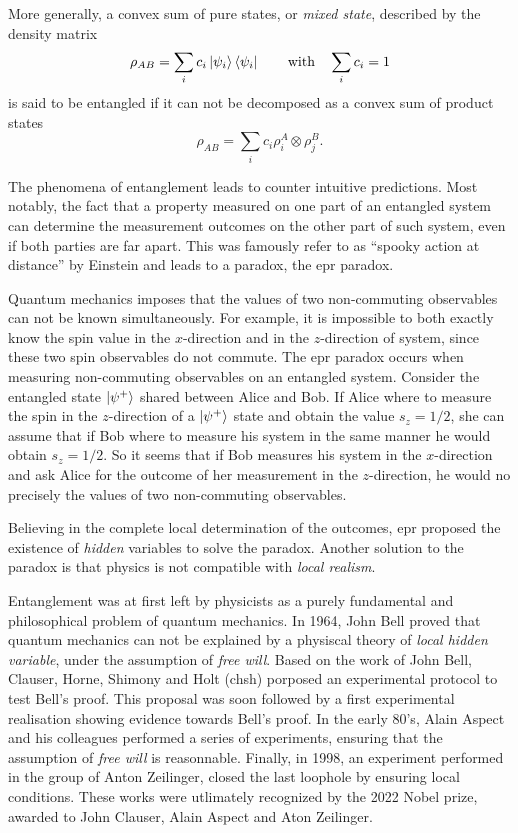 More generally, a convex sum of pure states, or \textit{mixed state}, described by the density matrix
\begin{equation}
	\rho_{AB} = \sum_i c_i \ket{\psi_i} \bra{\psi_i} \qquad \text{with} \quad \sum_i c_i = 1
	\label{eq:mixed_state}
\end{equation}
is said to be entangled if it can not be decomposed as a convex sum of product states
\begin{equation}
	\rho_{AB} = \sum_i c_i \rho^A_i \otimes \rho^B_j.
	\label{eq:product_state}
\end{equation}

\medbreak
The phenomena of entanglement leads to counter intuitive predictions. 
Most notably, the fact that a property measured on one part of an entangled system can determine the measurement outcomes on the other part of such system, even if both parties are far apart. 
This was famously refer to as \enquote{spooky action at distance} by Einstein and leads to a paradox, the \acrshort{epr} paradox.

Quantum mechanics imposes that the values of two non-commuting observables can not be known simultaneously. 
For example, it is impossible to both exactly know the spin value in the $x$-direction and in the $z$-direction of system, since these two spin observables do not commute.
The \acrshort{epr} paradox occurs when measuring non-commuting observables on an entangled system.
Consider the entangled state $\ket{\psi^+}$ shared between Alice and Bob.
If Alice where to measure the spin in the $z$-direction of a $\ket{\psi^+}$ state and obtain the value $s_z = 1/2$, she can assume that if Bob where to measure his system in the same manner he would obtain $s_z = 1/2$. 
So it seems that if Bob measures his system in the $x$-direction and ask Alice for the outcome of her measurement in the $z$-direction, he would no precisely the values of two non-commuting observables.

Believing in the complete local determination of the outcomes, \acrlong{epr} proposed the existence of \textit{hidden} variables to solve the paradox. Another solution to the paradox is that physics is not compatible with \textit{local realism}.

\medbreak
Entanglement was at first left by physicists as a purely fundamental and philosophical problem of quantum mechanics.
In 1964, John Bell proved that quantum mechanics can not be explained by a physiscal theory of \textit{local hidden variable}, under the assumption of \textit{free will}. 
Based on the work of John Bell, Clauser, Horne, Shimony and Holt (\acrshort{chsh}) porposed an experimental protocol to test Bell's proof. 
This proposal was soon followed by a first experimental realisation showing evidence towards Bell's proof.
In the early 80's, Alain Aspect and his colleagues performed a series of experiments, ensuring that the assumption of \textit{free will} is reasonnable.
Finally, in 1998, an experiment performed in the group of Anton Zeilinger, closed the last loophole by ensuring local conditions.
These works were utlimately recognized by the 2022 Nobel prize, awarded to John Clauser, Alain Aspect and Aton Zeilinger.

